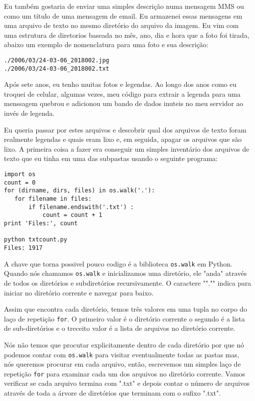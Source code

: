 Eu também gostaria de enviar uma simples descrição numa mensagem MMS ou como um título de uma mensagem de email. Eu armazenei essas mensagens em uma arquivo de texto no mesmo diretório do arquivo da imagem. Eu vim com uma estrutura de diretorios baseada no mês, ano, dia e hora que a foto foi tirada, abaixo um exemplo de nomenclatura para uma foto e sua descrição:

\begin{verbatim}
./2006/03/24-03-06_2018002.jpg
./2006/03/24-03-06_2018002.txt
\end{verbatim}
%

Após sete anos, eu tenho muitas fotos e legendas. Ao longo dos anos como eu troquei de celular, algumas vezes, meu código para extrair a legenda para uma menssagem quebrou e adicionou um bando de dados inuteis no meu servidor ao invés de legenda.


Eu queria passar por estes arquivos e descobrir qual dos arquivos de texto foram realmente legendas e quais eram lixo e, em seguida, apagar os arquivos que são lixo. A primeira coisa a fazer era conseguir um simples inventário dos arquivos de texto que eu tinha em uma das subpastas usando o seguinte programa:

\begin{verbatim}
import os
count = 0
for (dirname, dirs, files) in os.walk('.'):
   for filename in files:
       if filename.endswith('.txt') :
           count = count + 1
print 'Files:', count

python txtcount.py
Files: 1917
\end{verbatim}
%

A chave que torna possivel pouco codigo é a biblioteca {\tt os.walk} em Python. Quando nós chamamos
{\tt os.walk} e inicializamos uma diretório, ele "anda" através de todos os diretórios e subdiretórios recursivamente.
O caractere ""."" indica para iniciar no diretório corrente e navegar para baixo.

Assim que encontra cada diretório, temos três valores em uma tupla no corpo do laço de repetição {\tt for}.
O primeiro valor é o diretório corrente o segundo é a lista de sub-diretórios e o treceito valor é a lista de arquivos no diretório corrente.

Nós não temos que procutar explicitamente dentro de cada diretório por que nó podemos contar com {\tt os.walk} para visitar eventualmente todas as pastas mas, nós queremos procurar em cada arquivo, então, escrevemos um simples laço de repetição {\tt for} para examinar cada um dos arquivos no diretório corrente. Vamos verificar se cada arquivo termina com ".txt" e depois contar o número de arquivos através de toda a árvore de diretórios que terminam com o sufixo ".txt".

